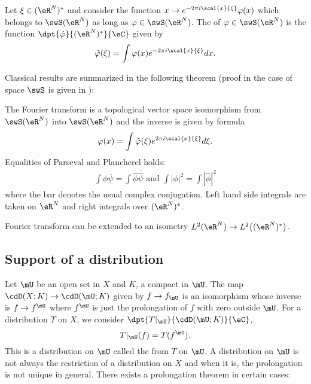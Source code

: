 Let $\xi\in(\eR^N)^*$ and consider the function  $x\to e^{-2\pi i\scal{x}{\xi}}\varphi(x)$
which belongs to $\swS(\eR^N)$ as long as $\varphi\in\swS(\eR^N)$. The  of $\varphi\in\swS(\eR^N)$ is the function $\dpt{\hat\varphi}{(\eR^N)^*}{\eC}$ given by
\begin{equation}
	\hat\varphi(\xi)=\int \varphi(x)e^{-2\pi i\scal{x}{\xi}}dx.
\end{equation}

Classical results are summarized in the following theorem (proof in the case of space $\swS$ is given in \cite{Treves}):

\begin{theorem}
	The Fourier transform is a topological vector space isomorphism from $\swS(\eR^N)$ into $\swS(\eR^N)$ and the inverse is given by formula
	\[
		\varphi(x)=\int \hat\varphi(\xi)e^{2\pi i\scal{x}{\xi}}d\xi.
	\]
	Equalities of Parseval and Plancherel holds:
	\begin{align}
		\int \phi\overline{\psi}=\int \hat\phi\overline{\hat\psi}\textrm{ and }
		\int| \phi |^2=\int| \hat\phi |^2
	\end{align}
	where the bar denotes the usual complex conjugation. Left hand side integrals are taken on $\eR^N$ and right integrals over $(\eR^N)^*$.
\end{theorem}

\begin{corollary}
	Fourier transform can be extended to an isometry $L^2(\eR^N)\to L^2\big( (\eR^N)^* \big)$.
\end{corollary}

\subsection{Support of a distribution}

Let $\mU$ be an open set in $X$ and $K$, a compact in $\mU$. The map $\cdD(X;K)\to\cdD(\mU;K)$ given by $f\to f_{\mU}$ is an isomorphism whose inverse is $f\to f^{\mU}$ where $f^{\mU}$ is just the prolongation of $f$ with zero outside $\mU$. For a distribution $T$ on $X$, we consider $\dpt{T|_{\mU}}{\cdD(\mU;K)}{\eC}$,
\[
	T|_{\mU}(f)=T(f^{\mU}).
\]
This is a distribution on $\mU$ called the  from $T$ on $\mU$. A distribution on $\mU$ is not always the restriction of a distribution on $X$ and when it is, the prolongation is not unique in general. There exists a prolongation theorem in certain cases:

